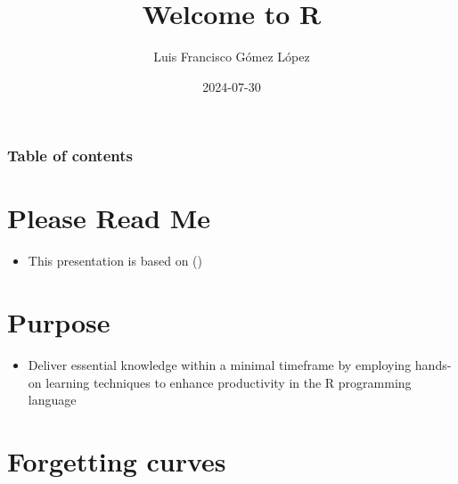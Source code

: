 \documentclass[
  ignorenonframetext,
]{beamer}
\title{Welcome to R}
\author{Luis Francisco Gómez López}
\date{2024-07-30}
\institute{FAEDIS}
\providecommand{\tightlist}{%
  \setlength{\itemsep}{0pt}\setlength{\parskip}{0pt}}\usepackage{longtable,booktabs,array}
\renewcommand*\contentsname{Table of contents}
\newcommand\contentsname{Table of contents}
\begin{document}
\frame{\titlepage}

\renewcommand*\contentsname{Table of contents}
\begin{frame}[allowframebreaks]
  \frametitle{Table of contents}
  \tableofcontents[hideallsubsections]
\end{frame}

\section{Please Read Me}\label{please-read-me}

\begin{frame}{}
\label{section}
\begin{itemize}
\tightlist
\item
  This presentation is based on ()
\end{itemize}
\end{frame}

\section{Purpose}\label{purpose}

\begin{frame}{}
\label{section-1}
\begin{itemize}
\tightlist
\item
  Deliver essential knowledge within a minimal timeframe by employing
  hands-on learning techniques to enhance productivity in the R
  programming language
\end{itemize}
\end{frame}

\section{Forgetting curves}\label{forgetting-curves}
\end{document}
